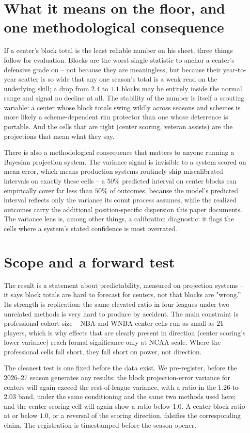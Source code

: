 \documentclass[11pt]{article}
\begin{document}
\section{What it means on the floor, and one methodological consequence}\label{sec-cons}
If a center's block total is the least reliable number on his sheet, three things follow for evaluation. Blocks are the worst single statistic to anchor a center's defensive grade on -- not because they are meaningless, but because their year-to-year scatter is so wide that any one season's total is a weak read on the underlying skill; a drop from $2.4$ to $1.1$ blocks may be entirely inside the normal range and signal no decline at all. The stability of the number is itself a scouting variable: a center whose block totals swing wildly across seasons and schemes is more likely a scheme-dependent rim protector than one whose deterrence is portable. And the cells that are tight (center scoring, veteran assists) are the projections that mean what they say.

There is also a methodological consequence that matters to anyone running a Bayesian projection system. The variance signal is invisible to a system scored on mean error, which means production systems routinely ship miscalibrated intervals on exactly these cells -- a $50\%$ predicted interval on center blocks can empirically cover far less than $50\%$ of outcomes, because the model's predicted interval reflects only the variance its count process assumes, while the realized outcomes carry the additional position-specific dispersion this paper documents. The variance lens is, among other things, a calibration diagnostic: it flags the cells where a system's stated confidence is most overrated.

\section{Scope and a forward test}\label{sec-forward}
The result is a statement about predictability, measured on projection systems -- it says block totals are hard to forecast for centers, not that blocks are "wrong.'' Its strength is replication: the same elevated ratio in four leagues under two unrelated methods is very hard to produce by accident. The main constraint is professional cohort size -- NBA and WNBA center cells run as small as $21$ players, which is why effects that are clearly present in direction (center scoring's lower variance) reach formal significance only at NCAA scale. Where the professional cells fall short, they fall short on power, not direction.

The cleanest test is one fixed before the data exist. We pre-register, before the 2026--27 season generates any results: the block projection-error variance for centers will again exceed the rest-of-league variance, with a ratio in the $1.26$-to-$2.03$ band, under the same conditioning and the same two methods used here; and the center-scoring cell will again show a ratio below $1.0$. A center-block ratio at or below $1.0$, or a reversal of the scoring direction, falsifies the corresponding claim. The registration is timestamped before the season opener.



\end{document}
